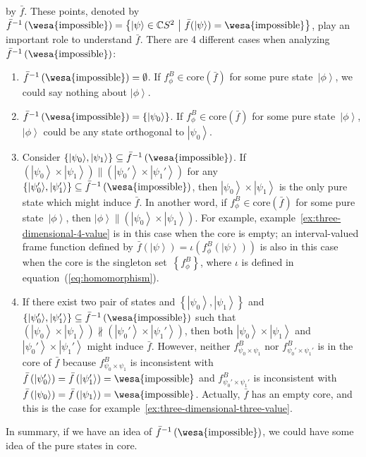 \documentclass[12pt]{iopart}
\theoremstyle{remark}
\newcommand{\imposs}{{\mbox{\wesa{impossible}}}}
\newcommand{\ket}[1]{{\left\vert{#1}\right\rangle}}
\newcommand{\set}[2]{\ensuremath{\left\{ {#1}~\middle|~{#2}\right\} }}
\begin{document}
by $\bar{f}$. These points, denoted by $\bar{f}^{-1}\left(\imposs\right)=\set{\ket{\psi}\in\mathbb{C}S^{2}}{\bar{f}(\ket{\psi})=\imposs}$,
play an important role to understand $\bar{f}$. There are 4 different
cases when analyzing $\bar{f}^{-1}\left(\imposs\right)$:
\begin{enumerate}
\item $\bar{f}^{-1}\left(\imposs\right)=\emptyset$. If $f_{\phi}^{B}\in\mathrm{core}\left(\bar{f}\right)$
for some pure state~$\ket{\phi}$, we could say nothing about $\ket{\phi}$.
\item $\bar{f}^{-1}\left(\imposs\right)=\left\{ \ket{\psi_{0}}\right\} $.
If $f_{\phi}^{B}\in\mathrm{core}\left(\bar{f}\right)$ for some pure
state~$\ket{\phi}$, $\ket{\phi}$ could be any state orthogonal
to $\ket{\psi_{0}}$.
\item Consider $\left\{ \ket{\psi_{0}},\ket{\psi_{1}}\right\} \subseteq\bar{f}^{-1}\left(\imposs\right)$.
If $\left(\ket{\psi_{0}}\times\ket{\psi_{1}}\right)\parallel\left(\ket{\psi_{0}'}\times\ket{\psi_{1}'}\right)$
for any $\left\{ \ket{\psi_{0}'},\ket{\psi_{1}'}\right\} \subseteq\bar{f}^{-1}\left(\imposs\right)$,
then $\ket{\psi_{0}}\times\ket{\psi_{1}}$ is the only pure state
which might induce $\bar{f}$. In another word, if $f_{\phi}^{B}\in\mathrm{core}\left(\bar{f}\right)$
for some pure state~$\ket{\phi}$, then $\ket{\phi}\parallel\left(\ket{\psi_{0}}\times\ket{\psi_{1}}\right)$.
For example, example~\ref{ex:three-dimensional-4-value} is in this
case when the core is empty; an interval-valued frame function defined
by $\bar{f}\left(\ket{\psi}\right)=\iota\left(f_{\phi}^{B}\left(\ket{\psi}\right)\right)$
is also in this case when the core is the singleton set~$\left\{ f_{\phi}^{B}\right\} $,
where $\iota$ is defined in equation~(\ref{eq:homomorphism}).
\item If there exist two pair of states and $\left\{ \ket{\psi_{0}},\ket{\psi_{1}}\right\} $
and $\left\{ \ket{\psi_{0}'},\ket{\psi_{1}'}\right\} \subseteq\bar{f}^{-1}\left(\imposs\right)$
such that $\left(\ket{\psi_{0}}\times\ket{\psi_{1}}\right)\nparallel\left(\ket{\psi_{0}'}\times\ket{\psi_{1}'}\right)$,
then both $\ket{\psi_{0}}\times\ket{\psi_{1}}$ and $\ket{\psi_{0}'}\times\ket{\psi_{1}'}$
might induce $\bar{f}$. However, neither $f_{\psi_{0}\times\psi_{1}}^{B}$
nor $f_{\psi_{0}'\times\psi_{1}'}^{B}$ is in the core of $\bar{f}$
because $f_{\psi_{0}\times\psi_{1}}^{B}$ is inconsistent with $\bar{f}\left(\ket{\psi_{0}'}\right)=\bar{f}\left(\ket{\psi_{1}'}\right)=\imposs$
and $f_{\psi_{0}'\times\psi_{1}'}^{B}$ is inconsistent with $\bar{f}\left(\ket{\psi_{0}}\right)=\bar{f}\left(\ket{\psi_{1}}\right)=\imposs$.
Actually, $\bar{f}$ has an empty core, and this is the case for example~\ref{ex:three-dimensional-three-value}.
\end{enumerate}
In summary, if we have an idea of $\bar{f}^{-1}\left(\imposs\right)$,
we could have some idea of the pure states in core.
\end{document}
